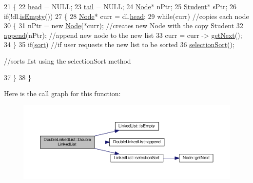 \begin{DoxyCode}
21 \{
22    \hyperlink{classLinkedList_a35e09287e2d2943707b011208e7a8ed2}{head} = NULL;
23    \hyperlink{classDoubleLinkedList_aa9a7bf7a1c989e7a49781ac62d49982c}{tail} = NULL;
24    \hyperlink{classNode}{Node}* nPtr;
25    \hyperlink{classStudent}{Student}* sPtr;
26    \textcolor{keywordflow}{if}(!dl.\hyperlink{classLinkedList_a1b28b1e19e5aa68f3d89352e307928f6}{isEmpty}())
27    \{
28       \hyperlink{classNode}{Node}* curr = dl.\hyperlink{classLinkedList_a35e09287e2d2943707b011208e7a8ed2}{head};
29       \textcolor{keywordflow}{while}(curr) \textcolor{comment}{//copies each node                                                                       
                                                                                                       }
30       \{
31          nPtr = \textcolor{keyword}{new} \hyperlink{classNode_a0ac1d44cfe588be564acf25485029bd8}{Node}(*curr); \textcolor{comment}{//creates new Node with the copy Student                              
                                                                                                           }
32          \hyperlink{classDoubleLinkedList_a5732ebaac8186c9847363c2569a1bf49}{append}(nPtr); \textcolor{comment}{//append new node to the new list                                             
                                                                                                             }
33          curr = curr -> \hyperlink{classNode_af8f2d178f274dd254e6e1965971f0fd0}{getNext}();
34       \}
35       \textcolor{keywordflow}{if}(\hyperlink{classDoubleLinkedList_aaaf8f24ea7fa8c66165d09015510b897}{sort}) \textcolor{comment}{//if user requests the new list to be sorted                                            
                                                                                                           }
36          \hyperlink{classLinkedList_abd329a83adcec046dc482f7566cf91f4}{selectionSort}(); \textcolor{comment}{//sorts list using the selectionSort method                         
                                                                                                                  
        }
37    \}
38 \}
\end{DoxyCode}


Here is the call graph for this function\+:
\nopagebreak
\begin{figure}[H]
\begin{center}
\leavevmode
\includegraphics[width=350pt]{classDoubleLinkedList_a369216eb49cf73fdc0aba61f0cc23785_cgraph}
\end{center}
\end{figure}


